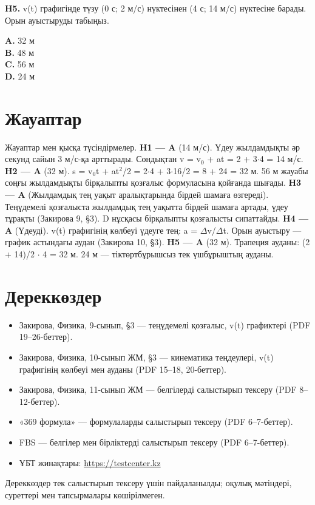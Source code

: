 \documentclass[11pt]{article}
\begin{document}
\textbf{H5.} v(t) графигінде түзу (0 с; 2 м/с) нүктесінен (4 с; 14 м/с) нүктесіне барады. Орын ауыстыруды табыңыз.

\textbf{A.} 32 м \\
\textbf{B.} 48 м \\
\textbf{C.} 56 м \\
\textbf{D.} 24 м
\clearpage
\section*{Жауаптар}
Жауаптар мен қысқа түсіндірмелер.
\textbf{H1 — A} (14 м/с). Үдеу жылдамдықты әр секунд сайын 3 м/с-қа арттырады. Сондықтан v = v$_0$ + at = 2 + 3$\cdot$4 = 14 м/с.
\textbf{H2 — A} (32 м). s = v$_0$t + at$^2$/2 = 2$\cdot$4 + 3$\cdot$16/2 = 8 + 24 = 32 м. 56 м жауабы соңғы жылдамдықты бірқалыпты қозғалыс формуласына қойғанда шығады.
\textbf{H3 — A} (Жылдамдық тең уақыт аралықтарында бірдей шамаға өзгереді). Теңүдемелі қозғалыста жылдамдық тең уақытта бірдей шамаға артады, үдеу тұрақты (Закирова 9, §3). D нұсқасы бірқалыпты қозғалысты сипаттайды.
\textbf{H4 — A} (Үдеуді). v(t) графигінің көлбеуі үдеуге тең: a = $\Delta$v/$\Delta$t. Орын ауыстыру — график астындағы аудан (Закирова 10, §3).
\textbf{H5 — A} (32 м). Трапеция ауданы: (2 + 14)/2 $\cdot$ 4 = 32 м. 24 м — тіктөртбұрышсыз тек үшбұрыштың ауданы.
\section*{Дереккөздер}
\begin{itemize}
\item Закирова, Физика, 9-сынып, §3 — теңүдемелі қозғалыс, v(t) графиктері (PDF 19–26-беттер).
\item Закирова, Физика, 10-сынып ЖМ, §3 — кинематика теңдеулері, v(t) графигінің көлбеуі мен ауданы (PDF 15–18, 20-беттер).
\item Закирова, Физика, 11-сынып ЖМ — белгілерді салыстырып тексеру (PDF 8–12-беттер).
\item «369 формула» — формулаларды салыстырып тексеру (PDF 6–7-беттер).
\item FBS — белгілер мен бірліктерді салыстырып тексеру (PDF 6–7-беттер).
\item ҰБТ жинақтары: \url{https://testcenter.kz}
\end{itemize}
Дереккөздер тек салыстырып тексеру үшін пайдаланылды; оқулық мәтіндері, суреттері мен тапсырмалары көшірілмеген.
\end{document}
